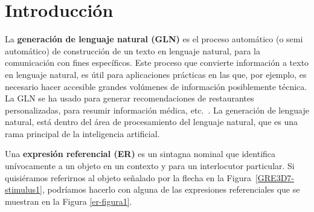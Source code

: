\chapter{Introducci\'on}
\label{sec:intro}



La {\bf generaci\'on de lenguaje natural (GLN)} es el proceso autom\'atico (o semi autom\'atico) de construcci\'on de un texto en lenguaje natural, para la comunicaci\'on con fines espec\'ificos. Este proceso que convierte informaci\'on a texto en lenguaje natural, es \'util para aplicaciones pr\'acticas en las que, por ejemplo, es necesario hacer accesible grandes vol\'umenes de informaci\'on posiblemente t\'ecnica. La GLN se ha usado para generar recomendaciones de restaurantes personalizadas, para resumir informaci\'on m\'edica, etc.~\cite{dale2000}. La generaci\'on de lenguaje natural, est\'a dentro del \'area de procesamiento del lenguaje natural, que es una rama principal de la inteligencia artificial.

Una {\bf expresi\'on referencial (ER)} es un sintagna nominal que identifica un\'ivocamente a un objeto en un contexto y para un interlocutor particular. Si quisi\'eramos referirnos al objeto se\~nalado por la flecha en la Figura~\ref{GRE3D7-stimulus1}, podr\'iamos hacerlo con alguna de las expresiones referenciales que se muestran en la Figura \ref{er-figura1}.

